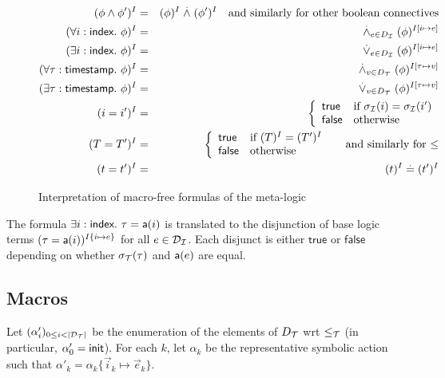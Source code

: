 \begin{figure}
  \begin{eqnarray*}
    (\phi\wedge\phi')^{I} &=& (\phi)^{I} \stackrel{.}{\wedge} (\phi')^{I}
    \quad \text{and similarly for other boolean connectives} \\
    (\forall i:\textsf{index}.~ \phi)^{I} &=&
    \stackrel{.}{\wedge}_{e\in D_{\mathcal{I}}} (\phi)^{I[i\mapsto e]} \\
    (\exists i:\textsf{index}.~ \phi)^{I} &=&
    \stackrel{.}{\vee}_{e\in D_{\mathcal{I}}} (\phi)^{I[i\mapsto e]} \\
    (\forall \tau:\textsf{timestamp}.~ \phi)^{I} &=&
    \stackrel{.}{\wedge}_{v\in D_{\mathcal{T}}} (\phi)^{I[\tau\mapsto v]} \\
    (\exists \tau:\textsf{timestamp}.~ \phi)^{I} &=&
    \stackrel{.}{\vee}_{v\in D_{\mathcal{T}}} (\phi)^{I[\tau\mapsto v]} \\
    (i=i')^{I} &=&
    \left\{\begin{array}{ll}
      \mathsf{true} & \text{if } \sigma_{\mathcal{I}}(i)=\sigma_{\mathcal{I}}(i') \\
      \mathsf{false} & \text{otherwise}
    \end{array}\right. \\
    (T = T')^{I} &=&
    \left\{\begin{array}{ll}
      \mathsf{true} & \text{if } (T)^{I} = (T')^{I} \\
      \mathsf{false} & \text{otherwise}
    \end{array}\right.
    \quad\text{ and similarly for $\leq$} \\
    (t=t')^{I} &=& (t)^{I} \stackrel{.}{=} (t')^{I}
  \end{eqnarray*}
  \caption{Interpretation of macro-free formulas of the meta-logic}
  \label{fig:interpf}
\end{figure}

\begin{example}
  The formula
  $\exists i:\textsf{index}.~ \tau = \textsf{a}(i)$
  is translated to the disjunction of base logic terms
  $(\tau = \textsf{a}(i))^{I\{i\mapsto e\}}$ for all $e \in \mathcal{D}_{\mathcal{I}}$.
  Each disjunct is either $\mathsf{true}$ or $\mathsf{false}$ depending on
  whether $\sigma_{\mathcal{T}}(\tau)$ and $\textsf{a}(e)$ are equal.
\end{example}

\subsection{Macros}
Let $(\alpha'_i)_{0 \leq i < |\mathcal{D}_{\mathcal{T}}|}$ be the enumeration of the elements
of $D_{\mathcal{T}}$ wrt $\leq_{\mathcal{T}}$ (in particular, $\alpha'_0 = \mathsf{init}$).
For each $k$, let $\alpha_k$ be the representative symbolic action
such that $\alpha'_k = \alpha_k\{\vec{i}_k\mapsto\vec{e}_k\}$.

